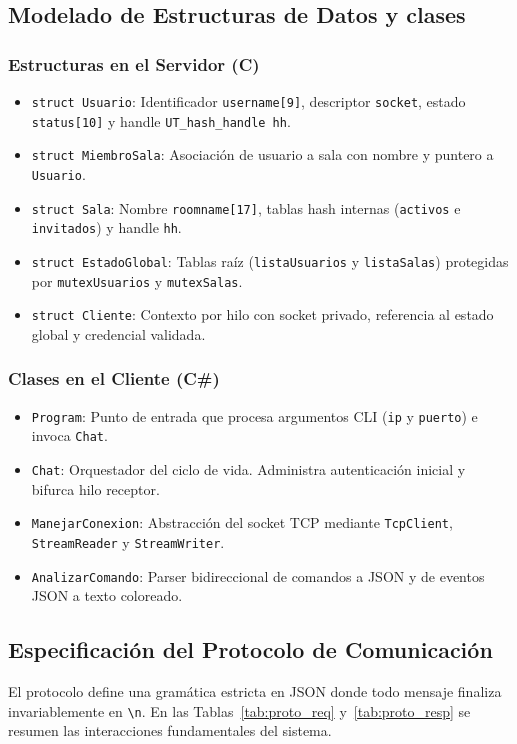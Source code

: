 \documentclass[12pt,a4paper]{article}
\begin{document}
\subsection{Modelado de Estructuras de Datos y clases}
\subsubsection{Estructuras en el Servidor (C)}
\begin{itemize}[noitemsep]
    \item \texttt{struct Usuario}: Identificador \texttt{username[9]}, descriptor \texttt{socket}, estado \texttt{status[10]} y handle \texttt{UT\_hash\_handle hh}.
    \item \texttt{struct MiembroSala}: Asociación de usuario a sala con nombre y puntero a \texttt{Usuario}.
    \item \texttt{struct Sala}: Nombre \texttt{roomname[17]}, tablas hash internas (\texttt{activos} e \texttt{invitados}) y handle \texttt{hh}.
    \item \texttt{struct EstadoGlobal}: Tablas raíz (\texttt{listaUsuarios} y \texttt{listaSalas}) protegidas por \texttt{mutexUsuarios} y \texttt{mutexSalas}.
    \item \texttt{struct Cliente}: Contexto por hilo con socket privado, referencia al estado global y credencial validada.
\end{itemize}

\subsubsection{Clases en el Cliente (C\#)}
\begin{itemize}[noitemsep]
    \item \texttt{Program}: Punto de entrada que procesa argumentos CLI (\texttt{ip} y \texttt{puerto}) e invoca \texttt{Chat}.
    \item \texttt{Chat}: Orquestador del ciclo de vida. Administra autenticación inicial y bifurca hilo receptor.
    \item \texttt{ManejarConexion}: Abstracción del socket TCP mediante \texttt{TcpClient}, \texttt{StreamReader} y \texttt{StreamWriter}.
    \item \texttt{AnalizarComando}: Parser bidireccional de comandos a JSON y de eventos JSON a texto coloreado.
\end{itemize}
\subsection{Especificación del Protocolo de Comunicación}
El protocolo define una gramática estricta en JSON donde todo mensaje finaliza invariablemente en \texttt{\textbackslash n}. En las Tablas~\ref{tab:proto_req} y~\ref{tab:proto_resp} se resumen las interacciones fundamentales del sistema.
\end{document}
